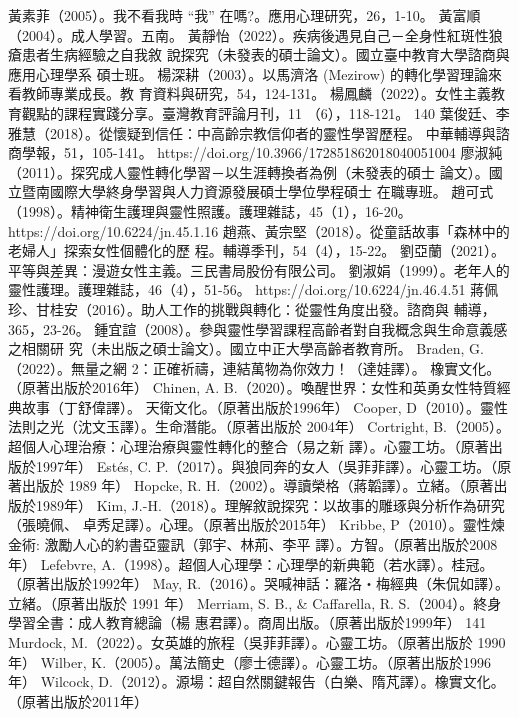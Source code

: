 黃素菲（2005）。我不看我時 “我” 在嗎?。應用心理研究，26，1-10。 
黃富順（2004）。成人學習。五南。 
黃靜怡（2022）。疾病後遇見自己－全身性紅斑性狼瘡患者生病經驗之自我敘
說探究（未發表的碩士論文）。國立臺中教育大學諮商與應用心理學系
碩士班。 
楊深耕（2003）。以馬濟洛 (Mezirow) 的轉化學習理論來看教師專業成長。教
育資料與研究，54，124-131。 
楊鳳麟（2022）。女性主義教育觀點的課程實踐分享。臺灣教育評論月刊，11
（6），118-121。 
140 
葉俊廷、李雅慧（2018）。從懷疑到信任：中高齡宗教信仰者的靈性學習歷程。
中華輔導與諮商學報，51，105-141。
https://doi.org/10.3966/172851862018040051004  
廖淑純（2011）。探究成人靈性轉化學習－以生涯轉換者為例（未發表的碩士
論文）。國立暨南國際大學終身學習與人力資源發展碩士學位學程碩士
在職專班。 
趙可式（1998）。精神衛生護理與靈性照護。護理雜誌，45（1），16-20。
https://doi.org/10.6224/jn.45.1.16  
趙燕、黃宗堅（2018）。從童話故事「森林中的老婦人」探索女性個體化的歷
程。輔導季刊，54（4），15-22。 
劉亞蘭（2021）。平等與差異：漫遊女性主義。三民書局股份有限公司。 
劉淑娟（1999）。老年人的靈性護理。護理雜誌，46（4），51-56。
https://doi.org/10.6224/jn.46.4.51  
蔣佩珍、甘桂安（2016）。助人工作的挑戰與轉化：從靈性角度出發。諮商與
輔導，365，23-26。 
鍾宜諠（2008）。參與靈性學習課程高齡者對自我概念與生命意義感之相關研
究（未出版之碩士論文）。國立中正大學高齡者教育所。 
Braden, G.（2022）。無量之網 2：正確祈禱，連結萬物為你效力！（達娃譯）。
橡實文化。（原著出版於2016年） 
Chinen, A. B.（2020）。喚醒世界：女性和英勇女性特質經典故事（丁舒偉譯）。 
天衛文化。（原著出版於1996年） 
Cooper, D（2010）。靈性法則之光（沈文玉譯）。生命潛能。（原著出版於
2004年） 
Cortright, B.（2005）。超個人心理治療：心理治療與靈性轉化的整合（易之新
譯）。心靈工坊。（原著出版於1997年） 
Estés, C. P.（2017）。與狼同奔的女人（吳菲菲譯）。心靈工坊。（原著出版於
1989 年） 
Hopcke, R. H.（2002）。導讀榮格（蔣韜譯）。立緒。（原著出版於1989年） 
Kim, J.-H.（2018）。理解敘說探究：以故事的雕琢與分析作為研究（張曉佩、
卓秀足譯）。心理。（原著出版於2015年） 
Kribbe, P（2010）。靈性煉金術: 激勵人心的約書亞靈訊（郭宇、林荊、李平
譯）。方智。（原著出版於2008年） 
Lefebvre, A.（1998）。超個人心理學：心理學的新典範（若水譯）。桂冠。
（原著出版於1992年） 
May, R.（2016）。哭喊神話：羅洛‧梅經典（朱侃如譯）。立緒。（原著出版於
1991 年） 
Merriam, S. B., & Caffarella, R. S.（2004）。終身學習全書：成人教育總論（楊
惠君譯）。商周出版。（原著出版於1999年） 
141 
Murdock, M.（2022）。女英雄的旅程（吳菲菲譯）。心靈工坊。（原著出版於
1990 年） 
Wilber, K.（2005）。萬法簡史（廖士德譯）。心靈工坊。（原著出版於1996
年） 
Wilcock, D.（2012）。源場：超自然關鍵報告（白樂、隋芃譯）。橡實文化。
（原著出版於2011年） 
